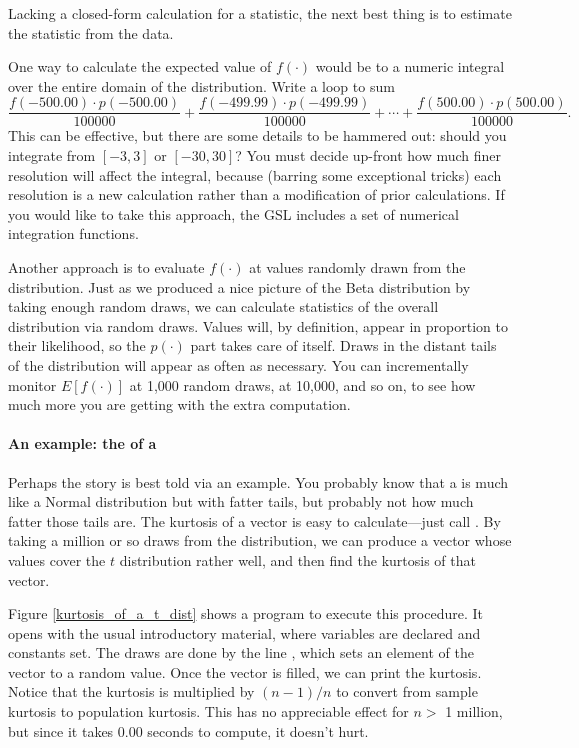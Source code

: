 Lacking a closed-form calculation for a statistic, the next best thing
is to estimate the statistic from the data. 

One way to calculate the expected value of $f(\cdot)$ would be to a numeric
integral over the entire domain of the distribution. Write a loop to
sum $$\frac{f(-500.00)\cdot p(-500.00)}{100000} + \frac{f(-499.99)\cdot
p(-499.99)}{100000} + \cdots + \frac{f(500.00)\cdot p(500.00)}{100000}.$$ This can be effective, but there are
some details to be hammered out: should you integrate from $[-3,3]$
or $[-30,30]$? You must decide up-front how much finer resolution will
affect the integral, because (barring some exceptional tricks) each
resolution is a new calculation rather than a modification of prior 
calculations. If you would like to take this approach, the GSL includes
a set of numerical integration functions.

Another approach is to evaluate $f(\cdot)$ at values randomly drawn
from the distribution.  Just as we produced a nice picture of the
Beta distribution by taking enough random draws, we can calculate
statistics of the overall distribution via random draws.  Values will,
by definition, appear in proportion to their likelihood, so the $p(\cdot)$
part takes care of itself. Draws in the distant tails of the distribution
will appear as often as necessary.  You can incrementally monitor
$E[f(\cdot)]$ at 1,000 random draws, at 10,000, and so on, to see how
much more you are getting with the extra computation.


\paragraph{An example: the  of a } Perhaps the
story is best told via an example.  You probably
know that a  is much like a Normal distribution but
with fatter tails, but probably not how much fatter those tails are.
The kurtosis of a vector is easy to calculate---just call
. By taking a million or so draws from the
distribution, we can produce a vector whose values cover the $t$
distribution rather well, and then find the kurtosis of that vector.

Figure \ref{kurtosis_of_a_t_dist} shows a program to execute this procedure. 
It opens with the usual introductory material, where variables are
declared and constants set. The draws are done by the line
, which sets an
element of the vector  to a random value. Once the vector is
filled, we can print the kurtosis. Notice that the kurtosis is
multiplied by $(n-1)/n$ to convert from sample kurtosis to population 
kurtosis. This has no appreciable effect for $n >$ 1 million, but since it takes
0.00 seconds to compute, it doesn't hurt.


